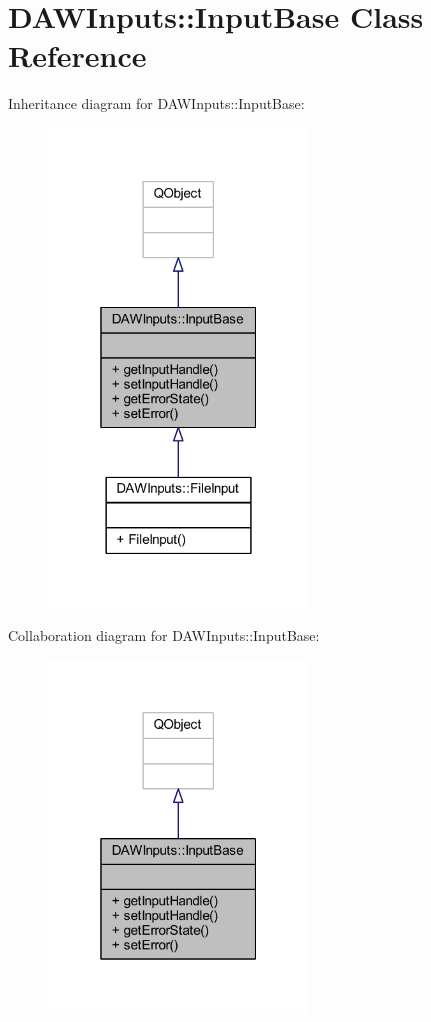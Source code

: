 \hypertarget{class_d_a_w_inputs_1_1_input_base}{\section{D\-A\-W\-Inputs\-:\-:Input\-Base Class Reference}
\label{class_d_a_w_inputs_1_1_input_base}
}


Inheritance diagram for D\-A\-W\-Inputs\-:\-:Input\-Base\-:
\nopagebreak
\begin{figure}[H]
\begin{center}
\leavevmode
\includegraphics[width=196pt]{class_d_a_w_inputs_1_1_input_base__inherit__graph}
\end{center}
\end{figure}


Collaboration diagram for D\-A\-W\-Inputs\-:\-:Input\-Base\-:
\nopagebreak
\begin{figure}[H]
\begin{center}
\leavevmode
\includegraphics[width=196pt]{class_d_a_w_inputs_1_1_input_base__coll__graph}
\end{center}
\end{figure}
